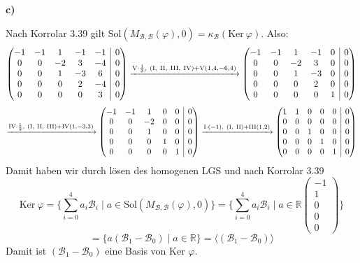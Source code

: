 \documentclass[a4paper,graphics,11pt]{article}
\begin{document}
\textbf{c)}

Nach Korrolar 3.39 gilt $\text{Sol}(M_{\mathcal{B}, \mathcal{B}}(\varphi), 0) = \kappa_{\mathcal{B}}(\text{Ker}\ \varphi)$. Also:
$$
    \begin{array}({@{}ccccc|c@{}})
        -1 & -1 & 1 & -1 & -1 & 0\\
        0 & 0 & -2 & 3 & -4 & 0\\
        0 & 0 & 1 & -3 & 6 & 0\\
        0 & 0 & 0 & 2 & -4 & 0\\
        0 & 0 & 0 & 0 & 3 & 0\\
    \end{array}
    \xrightarrow {\text{V}\cdot \frac{1}{3},\ (\text{I},\ \text{II},\ \text{III},\ \text{IV}) + \text{V}(1, 4, -6, 4)}
    \begin{array}({@{}ccccc|c@{}})
        -1 & -1 & 1 & -1 & 0 & 0\\
        0 & 0 & -2 & 3 & 0 & 0\\
        0 & 0 & 1 & -3 & 0 & 0\\
        0 & 0 & 0 & 2 & 0 & 0\\
        0 & 0 & 0 & 0 & 1 & 0\\
    \end{array}
$$$$
    \xrightarrow {\text{IV}\cdot \frac{1}{2},\ (\text{I},\ \text{II},\ \text{III}) + \text{IV}(1, -3, 3)}
    \begin{array}({@{}ccccc|c@{}})
        -1 & -1 & 1 & 0 & 0 & 0\\
        0 & 0 & -2 & 0 & 0 & 0\\
        0 & 0 & 1 & 0 & 0 & 0\\
        0 & 0 & 0 & 1 & 0 & 0\\
        0 & 0 & 0 & 0 & 1 & 0\\
    \end{array}
    \xrightarrow {\text{I}\cdot (-1),\ (\text{I},\ \text{II}) + \text{III}(1, 2)}
    \begin{array}({@{}ccccc|c@{}})
        1 & 1 & 0 & 0 & 0 & 0\\
        0 & 0 & 0 & 0 & 0 & 0\\
        0 & 0 & 1 & 0 & 0 & 0\\
        0 & 0 & 0 & 1 & 0 & 0\\
        0 & 0 & 0 & 0 & 1 & 0\\
    \end{array}
$$
Damit haben wir durch lösen des homogenen LGS und nach Korrolar 3.39
$$
    \text{Ker}\ \varphi
    = \{\sum_{i=0}^{4} a_i\mathcal{B}_i \mid a \in \text{Sol}(M_{\mathcal{B},\mathcal{B}}(\varphi), 0)\}
    = \{\sum_{i=0}^{4} a_i\mathcal{B}_i \mid a \in \mathbb{R}
    \begin{pmatrix}
        -1\\
        1\\
        0\\
        0\\
        0
    \end{pmatrix}
    \}
$$$$
    = \{a(\mathcal{B}_1 -\mathcal{B}_0) \mid a \in \mathbb{R}\}
    = \langle (\mathcal{B}_1 - \mathcal{B}_0 )\rangle
$$
Damit ist $(\mathcal{B}_1 - \mathcal{B}_0)$ eine Basis von Ker $\varphi$.
\newpage
\end{document}
